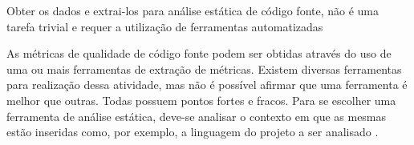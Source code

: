 Obter os dados e extrai-los para análise estática de código fonte, não é uma tarefa trivial e requer a utilização de ferramentas automatizadas \cite[pág.~2]{meirelles2013}

As métricas de qualidade de código fonte podem ser obtidas através do uso de uma ou mais ferramentas de extração de métricas. Existem diversas ferramentas para realização dessa atividade, mas não é possível afirmar que uma ferramenta é melhor que outras. Todas possuem pontos fortes e fracos. Para se escolher uma ferramenta de análise estática, deve-se analisar o contexto em que as mesmas estão inseridas como, por exemplo, a linguagem do projeto a ser analisado \cite{millani2013}.